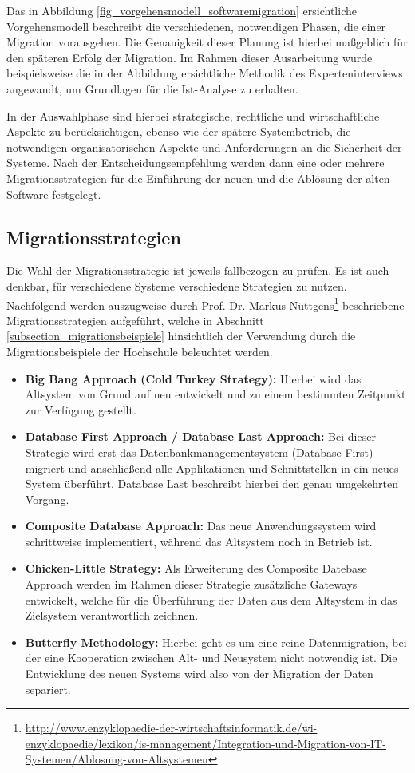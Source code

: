 Das in Abbildung \ref{fig_vorgehensmodell_softwaremigration} ersichtliche Vorgehensmodell beschreibt die verschiedenen, notwendigen Phasen, die einer Migration vorausgehen. Die Genauigkeit dieser Planung ist hierbei maßgeblich für den späteren Erfolg der Migration. Im Rahmen dieser Ausarbeitung wurde beispielsweise die in der Abbildung ersichtliche Methodik des Experteninterviews angewandt, um Grundlagen für die Ist-Analyse zu erhalten.

In der Auswahlphase sind hierbei strategische, rechtliche und wirtschaftliche Aspekte zu berücksichtigen, ebenso wie der spätere Systembetrieb, die notwendigen organisatorischen Aspekte und Anforderungen an die Sicherheit der Systeme. Nach der Entscheidungsempfehlung werden dann eine oder mehrere Migrationsstrategien für die Einführung der neuen und die Ablösung der alten Software festgelegt.

\subsection{Migrationsstrategien}
Die Wahl der Migrationsstrategie ist jeweils fallbezogen zu prüfen. Es ist auch denkbar, für verschiedene Systeme verschiedene Strategien zu nutzen. Nachfolgend werden auszugweise durch Prof. Dr. Markus Nüttgens\footnote{\url{http://www.enzyklopaedie-der-wirtschaftsinformatik.de/wi-enzyklopaedie/lexikon/is-management/Integration-und-Migration-von-IT-Systemen/Ablosung-von-Altsystemen}} beschriebene Migrationsstrategien aufgeführt, welche in Abschnitt \ref{subsection_migrationsbeispiele} hinsichtlich der Verwendung durch die Migrationsbeispiele der Hochschule beleuchtet werden.

\begin{itemize}
	\item \textbf{Big Bang Approach (Cold Turkey Strategy):} Hierbei wird das Altsystem von Grund auf neu entwickelt und zu einem bestimmten Zeitpunkt zur Verfügung gestellt.	
	
	\item \textbf{Database First Approach / Database Last Approach:} Bei dieser Strategie wird erst das Datenbankmanagementsystem (Database First) migriert und anschließend alle Applikationen und Schnittstellen in ein neues System überführt. Database Last beschreibt hierbei den genau umgekehrten Vorgang.
	
	\item \textbf{Composite Database Approach:} Das neue Anwendungssystem wird schrittweise implementiert, während das Altsystem noch in Betrieb ist.
	
	\item \textbf{Chicken-Little Strategy:} Als Erweiterung des Composite Datebase Approach werden im Rahmen dieser Strategie zusätzliche Gateways entwickelt, welche für die Überführung der Daten aus dem Altsystem in das Zielsystem verantwortlich zeichnen.
	
	\item \textbf{Butterfly Methodology:} Hierbei geht es um eine reine Datenmigration, bei der eine Kooperation zwischen Alt- und Neusystem nicht notwendig ist.  Die Entwicklung des neuen Systems wird also von der Migration der Daten separiert.
\end{itemize}


